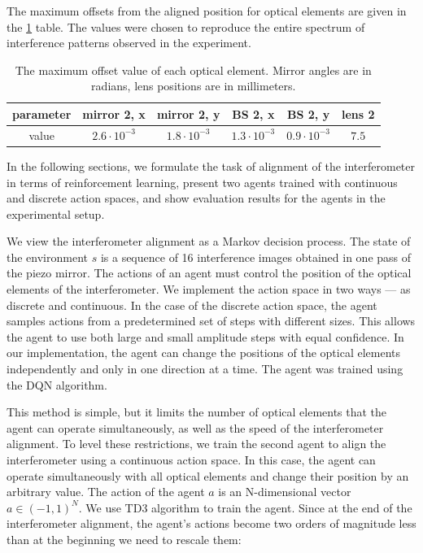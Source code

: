 The maximum offsets from the aligned position for optical elements are given in the \ref{tab:interf_dyn_params} table. The values were chosen to reproduce the entire spectrum of interference patterns observed in the experiment.

\begin{table} [htbp]
    \centering
    \begin{threeparttable}%
        \caption{The maximum offset value of each optical element. Mirror angles are in radians, lens positions are in millimeters.}
        \begin{tabular}{|c|c|c|c|c|c|}
            \hline
            \hline
            parameter & mirror 2, x & mirror 2, y & BS 2, x & BS 2, y & lens 2 \\
            \hline
            value & $2.6 \cdot 10^{-3}$ & $1.8 \cdot 10^{-3}$ & $1.3 \cdot 10^{-3}$ & $0.9 \cdot 10^{-3}$ & $7.5$ \\
            \hline
            \hline
        \end{tabular}
        \label{tab:interf_dyn_params}
    \end{threeparttable}
\end{table}


In the following sections, we formulate the task of alignment of the interferometer in terms of reinforcement learning, present two agents trained with continuous and discrete action spaces, and show evaluation results for the agents in the experimental setup. 

We view the interferometer alignment as a Markov decision process. The state of the environment $s$ is a sequence of 16 interference images obtained in one pass of the piezo mirror. The actions of an agent must control the position of the optical elements of the interferometer. We implement the action space in two ways --- as discrete and continuous. In the case of the discrete action space, the agent samples actions from a predetermined set of steps with different sizes. This allows the agent to use both large and small amplitude steps with equal confidence. In our implementation, the agent can change the positions of the optical elements independently and only in one direction at a time.  The agent was trained using the DQN \cite{dqn} algorithm.

This method is simple, but it limits the number of optical elements that the agent can operate simultaneously, as well as the speed of the interferometer alignment. To level these restrictions, we train the second agent to align the interferometer using a continuous action space. In this case, the agent can operate simultaneously with all optical elements and change their position by an arbitrary value. The action of the agent $a$ is an N-dimensional vector $a \in (-1, 1)^{N}$. We use TD3 \cite{ddpg} algorithm to train the agent. Since at the end of the interferometer alignment, the agent's actions become two orders of magnitude less than at the beginning we need to rescale them:

